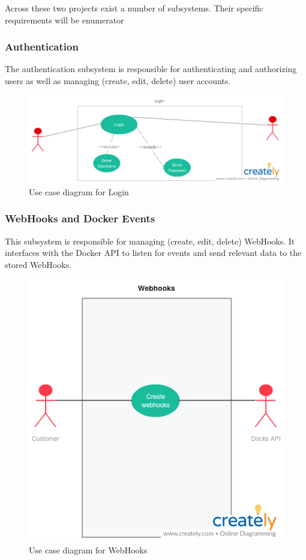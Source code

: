 \documentclass[]{article}
\begin{document}
Across these two projects exist a number of subsystems.
Their specific requirements will be enumerator

\subsubsection{Authentication}
The authentication subsystem is responsible for authenticating
and authorizing users as well as managing (create, edit, delete) user accounts.

\begin{figure}[H]
	\centering
	\includegraphics[scale=0.5]{uml/login.png}
	\caption{Use case diagram for Login}
\end{figure}

\subsubsection{WebHooks and Docker Events}
This subsystem is responsible for managing (create, edit, delete) WebHooks.
It interfaces with the Docker API to listen for events and send relevant
data to the stored WebHooks.

\begin{figure}[H]
	\centering
	\includegraphics[scale=0.5]{uml/webhooks.png}
	\caption{Use case diagram for WebHooks}
\end{figure}
\end{document}
